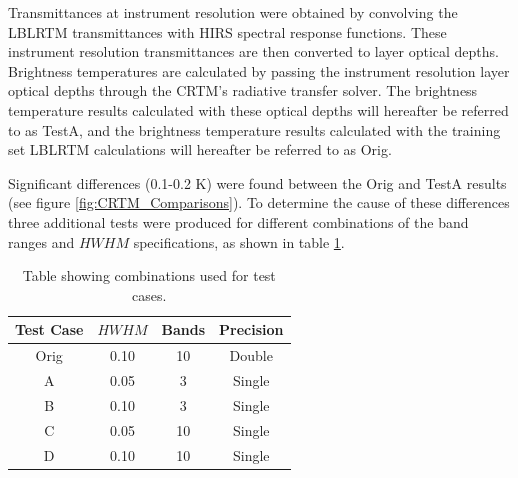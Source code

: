 Transmittances at instrument resolution were obtained by convolving the LBLRTM transmittances with HIRS spectral response functions. These instrument resolution transmittances
are then converted to layer optical depths. Brightness temperatures are calculated by passing the instrument resolution layer optical depths through the CRTM's radiative transfer solver. The brightness temperature results calculated with these optical depths will hereafter be referred to as TestA, and the brightness temperature results calculated with the training set LBLRTM calculations will hereafter be referred to as Orig. 

Significant differences (0.1-0.2 K) were found between the Orig and TestA results (see figure \ref{fig:CRTM_Comparisons}). To determine the cause
of these differences three additional tests were produced for different combinations of the band ranges and $HWHM$ specifications, as shown in table \ref{tab:CRTM_results}. 

\begin{table}[htp]
  \centering
  \begin{tabular}{c c c c}
    Test Case & $HWHM$ & Bands & Precision \\
    \hline
    Orig  & 0.10 & 10 & Double \\
    A & 0.05 & 3  & Single \\
    B & 0.10 & 3  & Single \\
    C & 0.05 & 10 & Single \\
    D & 0.10 & 10 & Single \\
 \end{tabular}
 \caption{Table showing combinations used for test cases.}
 \label{tab:CRTM_results}
\end{table}

